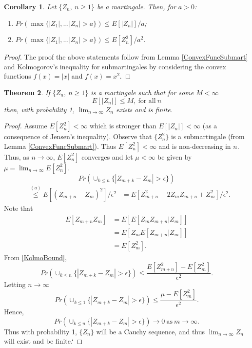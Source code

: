 \documentclass[a4paper,10pt]{article}
\theoremstyle{plain}
\newtheorem{thm}{Theorem}[section]
\newtheorem{cor}[thm]{Corollary}
\theoremstyle{definition}
\theoremstyle{remark}
\begin{document}
\begin{cor}
\label{MartingaleBoundCor}
Let $\{Z_n,~n \geq 1\}$ be a martingale. Then, for $a>0$:
\begin{enumerate}
\item $Pr(\max\{|Z_1|, \hdots |Z_n|>a\}) \leq E[|Z_n|]/a$;
\item $Pr(\max\{|Z_1|, \hdots |Z_n|>a\}) \leq E[Z_n^2]/a^2$.
\end{enumerate} 
\end{cor}
\begin{proof}
The proof the above statements follow from Lemma \ref{ConvexFuncSubmart} and Kolmogorov's inequality for submartingales by considering the convex functions $f(x)=|x|$ and $f(x)=x^2$. 
\end{proof}
\begin{thm}
\label{MartingaleConvergenceTheorem}
If $\{Z_n,~n \geq 1\}$ is a martingale such that for some $M< \infty$
\begin{equation*}
E[|Z_n|] \leq M, ~ \text{for all}~ n
\end{equation*}
then, with probability 1, $\lim_{n \rightarrow \infty}Z_n$ exists and is finite.
\end{thm}
\begin{proof}
Assume $E[Z_n^2]< \infty$ which is stronger than $E[|Z_n|]< \infty$ (as a consequence of Jensen's inequality). Observe that $\{Z_n^2\}$ is a submartingale (from Lemma \ref{ConvexFuncSubmart}). Thus $E[Z_n^2]<\infty$ and is non-decreasing in $n$. Thus, as $n \rightarrow \infty$, $E[Z_n^2]$ converges and let $\mu<\infty$ be given by $\mu=\lim_{n \rightarrow \infty}E[Z_n^2]$.
\begin{equation}
\label{KolmoBound}
Pr(\cup_{k \leq n} \{|Z_{m+k}-Z_m|> \epsilon\} )
\end{equation}  
\begin{eqnarray*}
&\stackrel{(a)}{\leq }E[(Z_{m+n}-Z_m)^2]/\epsilon^2
&=E[Z_{m+n}^2-2Z_mZ_{m+n}+Z_m^2]/\epsilon^2.
\end{eqnarray*}
Note that 
\begin{eqnarray*}
E[Z_{m+n}Z_m]&=E[E[Z_mZ_{m+n}|Z_m]]\\
&=E[Z_mE[Z_{m+n}|Z_m]]\\
&=E[Z_m^2].
\end{eqnarray*}
From \ref{KolmoBound}, 
\begin{equation*}
Pr(\cup_{k \leq n} \{|Z_{m+k}-Z_m|> \epsilon\}) \leq \frac{E[Z_{m+n}^2]-E[Z_m^2]}{\epsilon^2}.
\end{equation*}
Letting $n \rightarrow \infty$
\begin{equation*}
Pr(\cup_{k \leq 1} \{|Z_{m+k}-Z_m|> \epsilon\}) \leq \frac{\mu-E[Z_m^2]}{\epsilon^2}.
\end{equation*}
Hence,
\begin{equation*}
Pr(\cup_{k \leq n} \{|Z_{m+k}-Z_m|> \epsilon\}) \rightarrow 0 ~\text{as}~ m \rightarrow \infty.
\end{equation*}
Thus with probability 1, $\{Z_n\}$ will be  a Cauchy sequence, and thus $\lim_{n \rightarrow \infty}Z_n$ will exist and be finite.`
\end{proof}
\end{document}
